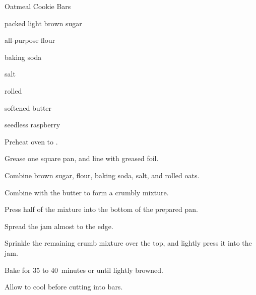\begin{recipe}{Oatmeal Cookie Bars}{}{}

\begin{ingredients}
\item \C{\half} packed light brown sugar
\item {} all-purpose flour
\item \tp{\quarter} baking soda
\item \tp{\eighth} salt
\item {} rolled 
\item \C{\half} softened butter
\item \C{\threequarter} seedless raspberry 
\end{ingredients}

\begin{directions}
\item Preheat oven to .
\item Grease one  square pan, and line with greased foil.
\item Combine brown sugar, flour, baking soda, salt, and rolled oats.
\item Combine with the butter to form a crumbly mixture.
\item Press half of the mixture into the bottom of the prepared pan.
\item Spread the jam almost to the edge.
\item Sprinkle the remaining crumb mixture over the top, and lightly press it into the jam.
\item Bake for 35 to 40~minutes or until lightly browned.
\item Allow to cool before cutting into bars.
\end{directions}
\end{recipe}

